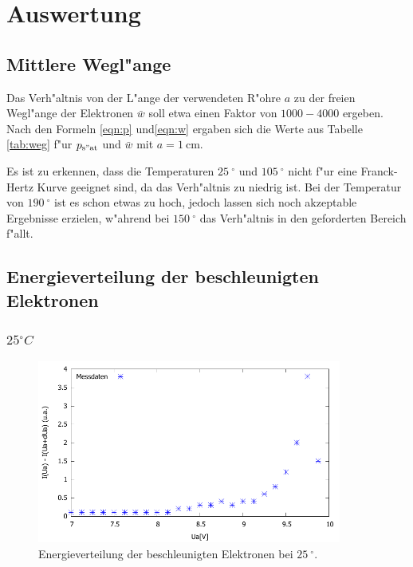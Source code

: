 \section{Auswertung}
\label{sec:auswertung}

\subsection{Mittlere Wegl"ange} %
\label{sub:mittlere_wegl_ange}



Das Verh"altnis von der L"ange der verwendeten R"ohre $a$ zu der freien Wegl"ange der Elektronen $\bar{w}$ soll etwa einen Faktor von $1000 - 4000$ ergeben.
Nach den Formeln \eqref{eqn:p} und\eqref{eqn:w} ergaben sich die Werte aus Tabelle \ref{tab:weg} f"ur $p_\mathrm{s"at}$ und $\bar{w}$ mit $a = \SI{1}{\centi\meter}$.

Es ist zu erkennen, dass die Temperaturen $\SI{25}{^\circ}$ und $\SI{105}{^\circ}$ nicht f"ur eine Franck-Hertz Kurve geeignet sind, da das Verh"altnis zu niedrig ist.
Bei der Temperatur von $\SI{190}{^\circ}$ ist es schon etwas zu hoch, jedoch lassen sich noch akzeptable Ergebnisse erzielen, w"ahrend bei $\SI{150}{^\circ}$ das Verh"altnis in den geforderten Bereich f"allt.

\subsection{Energieverteilung der beschleunigten Elektronen} %
\label{sub:energieverteilung_der_beschleunigten_elektronen}

\subsubsection{$\si{25}{^\circ C}$} %
\label{sub:_si}



\begin{figure}[!h]
	\centering
	\includegraphics[width = 10cm]{img/t20.pdf}
	\caption{Energieverteilung der beschleunigten Elektronen bei $\SI{25}{^\circ}$.}
	\label{gra:25}
\end{figure}

